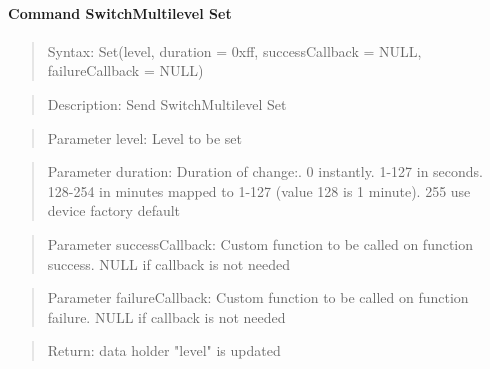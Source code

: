 \paragraph {Command SwitchMultilevel Set}
\begin{quote} Syntax: Set(level, duration = 0xff, successCallback = NULL, failureCallback = NULL)\end{quote}
\begin{quote} Description: Send SwitchMultilevel Set\end{quote}
\begin{quote} Parameter level: Level to be set\end{quote}
\begin{quote} Parameter duration: Duration of change:. 0 instantly. 1-127 in seconds. 128-254 in minutes mapped to 1-127 (value 128 is 1 minute). 255 use device factory default\end{quote}
\begin{quote} Parameter successCallback: Custom function to be called on function success. NULL if callback is not needed\end{quote}
\begin{quote} Parameter failureCallback: Custom function to be called on function failure. NULL if callback is not needed\end{quote}
\begin{quote} Return: data holder "level" is updated\end{quote}


